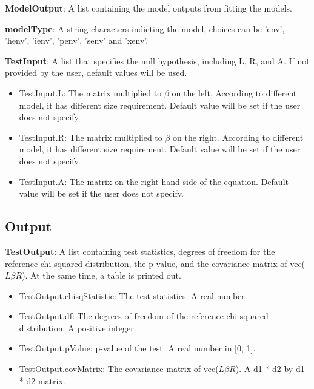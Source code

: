 \documentclass[a4paper,11pt,openany]{memoir}
\begin{document}
\begin{par}
\textbf{ModelOutput}: A list containing the model outputs from fitting the models.
\end{par} \vspace{1em}
\begin{par}
\textbf{modelType}: A string characters indicting the model, choices can be 'env', 'henv', 'ienv', 'penv', 'senv' and 'xenv'.
\end{par} \vspace{1em}
\begin{par}
\textbf{TestInput}: A list that specifies the null hypothesis, including L, R, and A.  If not provided by the user, default values will be used.
\end{par} \vspace{1em}
\begin{itemize}
\setlength{\itemsep}{-1ex}
   \item TestInput.L: The matrix multiplied to $\beta$ on the left.  According to different model, it has different size requirement.  Default value will be set if the user does not specify.
\end{itemize}
\begin{itemize}
\setlength{\itemsep}{-1ex}
   \item TestInput.R: The matrix multiplied to $\beta$ on the right.  According to different model, it has different size requirement.  Default value will be set if the user does not specify.
\end{itemize}
\begin{itemize}
\setlength{\itemsep}{-1ex}
   \item TestInput.A: The matrix on the right hand side of the equation.  Default value will be set if the user does not specify.
\end{itemize}


\subsection*{Output}

\begin{par}
\textbf{TestOutput}: A list containing test statistics, degrees of freedom for the reference chi-squared distribution, the p-value, and the covariance matrix of vec($L\beta R$).  At the same time, a table is printed out.
\end{par} \vspace{1em}
\begin{itemize}
\setlength{\itemsep}{-1ex}
   \item TestOutput.chisqStatistic: The test statistics. A real number.
   \item TestOutput.df: The degrees of freedom of the reference chi-squared distribution.  A positive integer.
   \item TestOutput.pValue: p-value of the test.  A real number in [0, 1].
   \item TestOutput.covMatrix: The covariance matrix of vec($L\beta R$). A d1 * d2 by d1 * d2 matrix.
\end{itemize}
\end{document}
